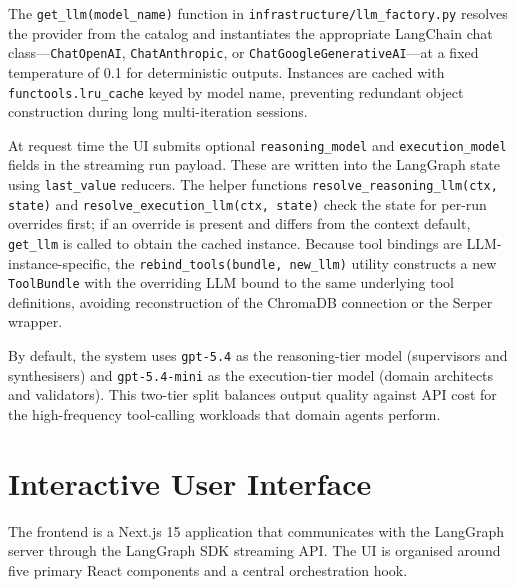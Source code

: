 The \texttt{get\_llm(model\_name)} function in \texttt{infrastructure/llm\_factory.py} resolves the provider from the catalog and instantiates the appropriate LangChain chat class---\texttt{ChatOpenAI}, \texttt{ChatAnthropic}, or \texttt{ChatGoogleGenerativeAI}---at a fixed temperature of 0.1 for deterministic outputs. Instances are cached with \texttt{functools.lru\_cache} keyed by model name, preventing redundant object construction during long multi-iteration sessions.

At request time the UI submits optional \texttt{reasoning\_model} and \texttt{execution\_model} fields in the streaming run payload. These are written into the LangGraph state using \texttt{last\_value} reducers. The helper functions \texttt{resolve\_reasoning\_llm(ctx, state)} and \texttt{resolve\_execution\_llm(ctx, state)} check the state for per-run overrides first; if an override is present and differs from the context default, \texttt{get\_llm} is called to obtain the cached instance. Because tool bindings are LLM-instance-specific, the \texttt{rebind\_tools(bundle, new\_llm)} utility constructs a new \texttt{ToolBundle} with the overriding LLM bound to the same underlying tool definitions, avoiding reconstruction of the ChromaDB connection or the Serper wrapper.

By default, the system uses \texttt{gpt-5.4} as the reasoning-tier model (supervisors and synthesisers) and \texttt{gpt-5.4-mini} as the execution-tier model (domain architects and validators). This two-tier split balances output quality against API cost for the high-frequency tool-calling workloads that domain agents perform.

\section{Interactive User Interface}

The frontend is a Next.js 15 application that communicates with the LangGraph server through the LangGraph SDK streaming API. The UI is organised around five primary React components and a central orchestration hook.

